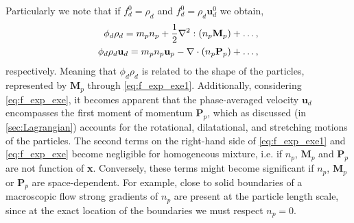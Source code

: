 Particularly we note that if $f_d^0 = \rho_d$ and $f_d^0 = \rho_d \textbf{u}_d^0$ we obtain, 
\begin{align}
    \label{eq:f_exp_exe1}
    \phi_d \rho_d
    = m_p n_p 
    + \frac{1}{2}\mathbf{\nabla}^2 : (n_p\textbf{M}_p)+\ldots,\\
    \phi_d \rho_d \textbf{u}_d
    = m_p n_p \textbf{u}_p 
    - \mathbf{\nabla}\cdot (n_p\textbf{P}_p)+\ldots,
    \label{eq:f_exp_exe}
\end{align}
respectively. 
Meaning that $\phi_d\rho_d$ is related to the shape of the particles, represented by $\textbf{M}_p$ through \ref{eq:f_exp_exe1}.
Additionally, considering \ref{eq:f_exp_exe}, it becomes apparent that the phase-averaged velocity $\textbf{u}_d$ encompasses the first moment of momentum $\textbf{P}_p$, which as discussed (in \ref{sec:Lagrangian}) accounts for the rotational, dilatational, and stretching motions of the particles. 
The second terms on the right-hand side of \ref{eq:f_exp_exe1} and \ref{eq:f_exp_exe} become negligible for homogeneous mixture, i.e. if $n_p$, $\textbf{M}_p$ and $\textbf{P}_p$ are not function of \textbf{x}. 
Conversely, these terms might become significant if $n_p$, $\textbf{M}_p$ or $\textbf{P}_p$ are space-dependent.
For example, close to solid boundaries of a macroscopic flow strong gradients of $n_p$ are present at the particle length scale, since at the exact location of the boundaries we must respect $n_p = 0$. 


